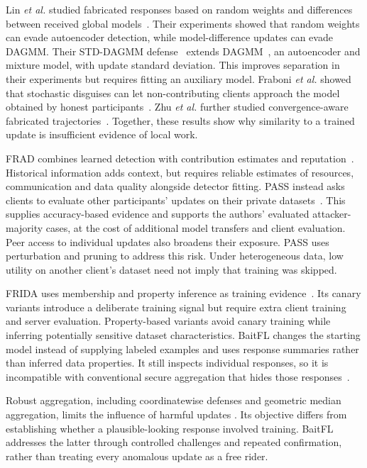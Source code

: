 \documentclass[conference]{IEEEtran}
\makeatletter
\renewcommand{\section}{\@startsection{section}{1}{\z@}{1.5ex}{0.7ex}{\normalfont\normalsize\centering\scshape}}
\makeatother
\begin{document}
\section{Related Work}
Lin \emph{et al.} studied fabricated responses based on random weights
and differences between received global models~\cite{lin2019freeriders}.
Their experiments showed that random weights can evade autoencoder
detection, while model-difference updates can evade DAGMM. Their
STD-DAGMM defense~\cite{lin2019freeriders} extends
DAGMM~\cite{zong2018dagmm}, an autoencoder and mixture model, with update
standard deviation. This improves separation in their
experiments but requires fitting an auxiliary model. Fraboni \emph{et al.}
showed that stochastic disguises can let non-contributing clients approach
the model obtained by honest participants~\cite{fraboni2021freerider}.
Zhu \emph{et al.} further studied convergence-aware fabricated
trajectories~\cite{zhu2021advanced}. Together, these results show why
similarity to a trained update is insufficient evidence of local work.

FRAD combines learned detection with contribution estimates and
reputation~\cite{wang2024frad}. Historical information adds context, but
requires reliable estimates of resources, communication and data quality
alongside detector fitting. PASS instead asks clients to evaluate other
participants' updates on their private datasets~\cite{wang2024pass}.
This supplies accuracy-based evidence and supports the authors' evaluated
attacker-majority cases, at the cost of additional model transfers and
client evaluation. Peer access to individual updates also broadens their
exposure. PASS uses perturbation and pruning to address this risk.
Under heterogeneous data, low utility on another client's dataset need
not imply that training was skipped.

FRIDA uses membership and property inference as training
evidence~\cite{recasens2026frida}. Its canary variants introduce a
deliberate training signal but require extra client training and server
evaluation. Property-based variants avoid canary training while inferring
potentially sensitive dataset characteristics. BaitFL changes the
starting model instead of supplying labeled examples and uses response
summaries rather than inferred data properties. It still inspects individual
responses, so it is incompatible with conventional secure aggregation
that hides those responses~\cite{bonawitz2017practical}.

Robust aggregation, including coordinatewise defenses and geometric
median aggregation, limits the influence of harmful updates
\cite{yin2018byzantine,pillutla2022rfa}. Its objective differs from
establishing whether a plausible-looking response involved training.
BaitFL addresses the latter through controlled challenges and repeated
confirmation, rather than treating every anomalous update as a free rider.
\end{document}

